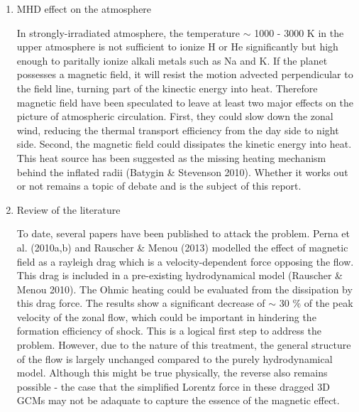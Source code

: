 \documentclass[11pt]{article}
\begin{document}
\begin{enumerate}
\item MHD effect on the atmosphere

In strongly-irradiated atmosphere, the temperature $\sim$ 1000 - 3000 K in the upper atmosphere is not sufficient to ionize H or He significantly but high enough to paritally ionize alkali metals such as Na and K. If the planet possesses a magnetic field, it will resist the motion advected perpendicular to the field line, turning part of the kinectic energy into heat. Therefore magnetic field have been speculated to leave at least two major effects on the picture of atmospheric circulation. First, they could slow down the zonal wind, reducing the thermal transport efficiency from the day side to night side. Second, the magnetic field could dissipates the kinetic energy into heat. This heat source has been suggested as the missing heating mechanism behind the inflated radii (Batygin \& Stevenson 2010). Whether it works out or not remains a topic of debate and is the subject of this report.


\item Review of the literature

To date, several papers have been published to attack the problem. Perna et al. (2010a,b) and Rauscher \& Menou (2013) modelled the effect of magnetic field as a rayleigh drag which is a velocity-dependent force opposing the flow. This drag is included in a pre-existing hydrodynamical model (Rauscher \& Menou 2010). The Ohmic heating could be evaluated from the dissipation by this drag force. The results show a significant decrease  of $\sim$ 30 \% of the peak velocity of the zonal flow, which could be important in hindering the formation efficiency of shock. This is a logical first step to address the problem. However, due to the nature of this treatment, the general structure of the flow is largely unchanged compared to the purely hydrodynamical model. Although this might be true physically, the reverse also remains possible - the case that the simplified Lorentz force in these dragged 3D GCMs may not be adaquate to capture the essence of the magnetic effect. 


\end{enumerate}
\end{document}
